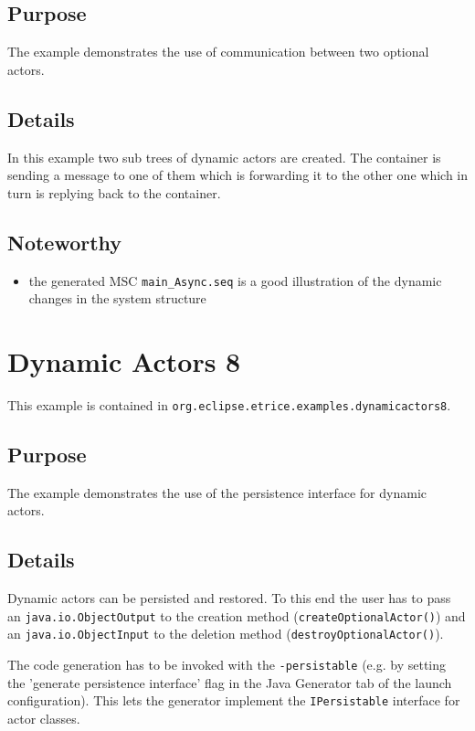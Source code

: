 \subsection{Purpose}

The example demonstrates the use of communication between two optional actors.

\subsection{Details}

In this example two sub trees of dynamic actors are created. The container is sending a message to one of them which is forwarding
it to the other one which in turn is replying back to the container.

\subsection{Noteworthy}

\begin{itemize}
\item the generated MSC \texttt{main\_Async.seq} is a good illustration of the dynamic changes in the system structure
\end{itemize}

\section{Dynamic Actors 8}

This example is contained in \texttt{org.eclipse.etrice.examples.dynamicactors8}.

\subsection{Purpose}

The example demonstrates the use of the persistence interface for dynamic actors.

\subsection{Details}

Dynamic actors can be persisted and restored. To this end the user has to pass an \texttt{java.io.ObjectOutput} to
the creation method (\texttt{createOptionalActor()}) and an \texttt{java.io.ObjectInput} to the deletion method (\texttt{destroyOptionalActor()}).

The code generation has to be invoked with the \texttt{-persistable} (e.g. by setting the 'generate persistence interface' flag in the Java Generator tab
of the launch configuration). This lets the generator implement the \texttt{IPersistable} interface for actor classes.

